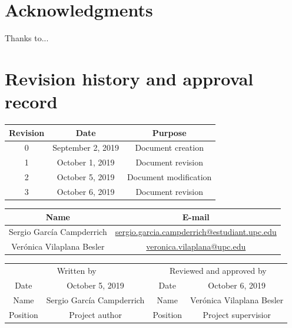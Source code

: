 \documentclass[a4paper,12pt,titlepage]{article}
\begin{document}
\section*{Acknowledgments}
Thanks to...
\thispagestyle{empty}

\section*{Revision history and approval record}
\begin{center}
\begin{tabular}{*3c}
\toprule
Revision & Date & Purpose \\
\midrule
0 & September 2, 2019 & Document creation \\
1 & October 1, 2019 & Document revision \\
2 & October 5, 2019 & Document modification \\
3 & October 6, 2019 & Document revision \\
\bottomrule
\end{tabular}
\end{center}

\begin{center}
\begin{tabular}{*2c}
\toprule
Name & E-mail \\
\midrule
Sergio García Campderrich & \url{sergio.garcia.campderrich@estudiant.upc.edu} \\
Verónica Vilaplana Besler & \url{veronica.vilaplana@upc.edu} \\
\bottomrule
\end{tabular}
\end{center}

\begin{center}
\begin{tabular}{*4c}
\toprule
\multicolumn{2}{c}{Written by} & \multicolumn{2}{c}{Reviewed and approved by}\\
Date & October 5, 2019 & Date & October 6, 2019 \\
\midrule
Name & Sergio García Campderrich & Name & Verónica Vilaplana Besler \\
Position & Project author & Position & Project supervisior \\
\bottomrule
\end{tabular}
\end{center}

\thispagestyle{empty}

\tableofcontents
\thispagestyle{empty}
\end{document}
